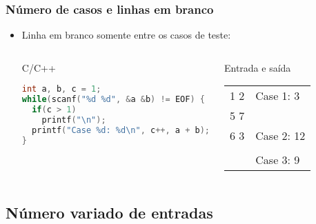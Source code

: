 \begin{frame} [fragile]
  \frametitle{Número de casos e linhas em branco}
    \begin{itemize}
      \item {\small Linha em branco somente entre os casos de teste:}
      \begin{columns}
      \begin{block:ie}{C/C++}
	\begin{lstlisting}[language=c]
int a, b, c = 1;
while(scanf("%d %d", &a &b) != EOF) {
  if(c > 1)
    printf("\n");
  printf("Case %d: %d\n", c++, a + b);
}
	\end{lstlisting}
      \end{block:ie}

      \begin{block:ie}{Entrada e saída} \scriptsize
	\begin{tabularx}{\textwidth}{|X|X|}
	  1 2&Case 1: 3\\5 7&\\6 3&Case 2: 12\\&\\&Case 3: 9
	\end{tabularx}
      \end{block:ie}
    \end{columns}
  \end{itemize}
\end{frame}

\subsection{Número variado de entradas}

